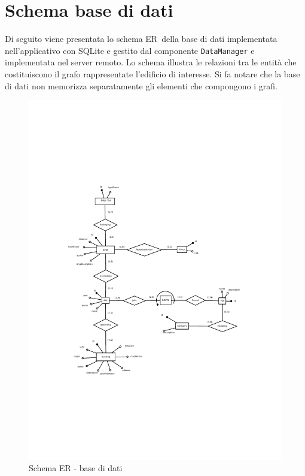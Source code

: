 \documentclass[../DefinizioneDiProdotto.tex]{subfiles}
\begin{document}
\section{Schema base di dati}

	Di seguito viene presentata lo schema ER\g\ della base di dati implementata nell'applicativo con SQLite e gestito dal componente \verb|DataManager| e implementata nel server remoto. Lo schema illustra le relazioni tra le entità che costituiscono il grafo rappresentate l'edificio di interesse. Si fa notare che la base di dati non memorizza separatamente gli elementi che compongono i grafi.

	\begin{figure} [h]
			\includegraphics[width=\textwidth]{diagrams/Database}		
			\caption{Schema ER - base di dati}
			\label{Database}
	\end{figure}
\end{document}

